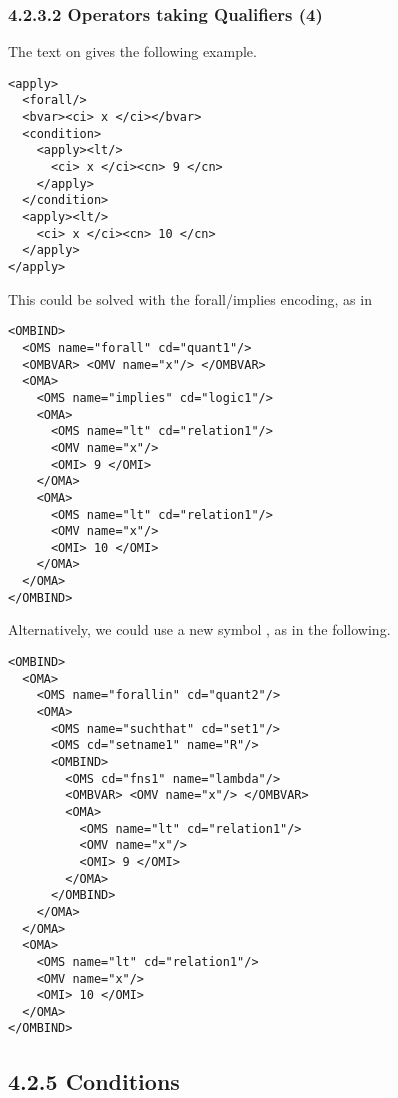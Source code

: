 \documentclass{llncs}
\begin{document}
{\subsubsection{4.2.3.2 Operators taking Qualifiers (4)}\label{42324}
The text on {} gives the following example.
\begin{lstlisting}[language=MathML2]
<apply>
  <forall/>
  <bvar><ci> x </ci></bvar>
  <condition>
    <apply><lt/>
      <ci> x </ci><cn> 9 </cn>
    </apply>
  </condition>
  <apply><lt/>
    <ci> x </ci><cn> 10 </cn>
  </apply>
</apply>
\end{lstlisting}
This could be solved with the forall/implies encoding, as in
\begin{lstlisting}
<OMBIND>
  <OMS name="forall" cd="quant1"/>
  <OMBVAR> <OMV name="x"/> </OMBVAR>
  <OMA>
    <OMS name="implies" cd="logic1"/>
    <OMA>
      <OMS name="lt" cd="relation1"/>
      <OMV name="x"/> 
      <OMI> 9 </OMI>
    </OMA>
    <OMA>
      <OMS name="lt" cd="relation1"/>
      <OMV name="x"/> 
      <OMI> 10 </OMI>
    </OMA>
  </OMA>
</OMBIND>
\end{lstlisting}
Alternatively, we could use a new symbol {},  as in the
following.
\begin{lstlisting}
<OMBIND>
  <OMA>
    <OMS name="forallin" cd="quant2"/>
    <OMA>
      <OMS name="suchthat" cd="set1"/>
      <OMS cd="setname1" name="R"/>
      <OMBIND>
        <OMS cd="fns1" name="lambda"/>
        <OMBVAR> <OMV name="x"/> </OMBVAR>
        <OMA>
          <OMS name="lt" cd="relation1"/>
          <OMV name="x"/> 
          <OMI> 9 </OMI>
        </OMA>
      </OMBIND>
    </OMA>
  </OMA>
  <OMA>
    <OMS name="lt" cd="relation1"/>
    <OMV name="x"/> 
    <OMI> 10 </OMI>
  </OMA>
</OMBIND>
\end{lstlisting}
\subsection{4.2.5 Conditions}\label{425}
}
\end{document}
